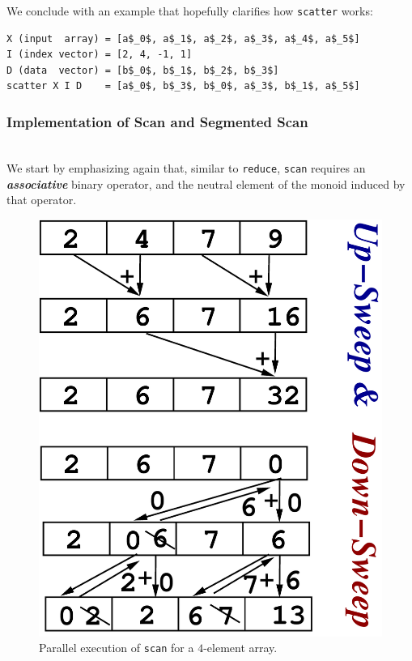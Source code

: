 \documentclass[acmsmall,review]{acmart}\settopmatter{printfolios=true,printccs=false,printacmref=false}
\begin{document}
We conclude with an example that hopefully clarifies how 
\lstinline{scatter} works:
\begin{lstlisting}[mathescape=true]
X (input  array) = [a$_0$, a$_1$, a$_2$, a$_3$, a$_4$, a$_5$]
I (index vector) = [2, 4, -1, 1]
D (data  vector) = [b$_0$, b$_1$, b$_2$, b$_3$]
scatter X I D    = [a$_0$, b$_3$, b$_0$, a$_3$, b$_1$, a$_5$]
\end{lstlisting}\vspace{-2ex}


\subsubsection{Implementation of Scan and Segmented Scan}
\label{subsubsub:scan-impl}
$\mbox{ }$\\

We start by emphasizing again that, similar to \lstinline{reduce},
\lstinline{scan} requires an \emph{\bf associative} binary operator,
and the neutral element of the monoid induced by that operator.

\begin{figure}
\includegraphics[height=33ex]{Figures/L2/ScanEg.pdf} 
\caption{Parallel execution of \lstinline{scan} for a $4$-element array.}
\label{fig:scan-eg}
\end{figure} 
\end{document}
